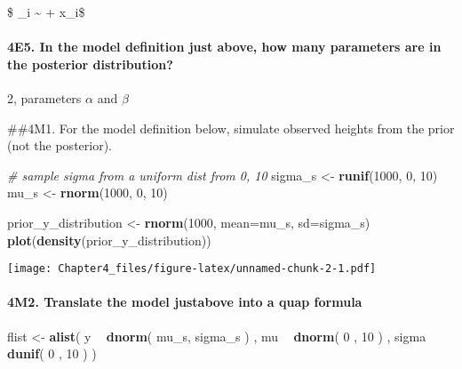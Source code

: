 \documentclass[]{article}
\newenvironment{Shaded}{\begin{snugshade}}{\end{snugshade}}
\newcommand{\CommentTok}[1]{\textcolor[rgb]{0.56,0.35,0.01}{\textit{#1}}}
\newcommand{\DataTypeTok}[1]{\textcolor[rgb]{0.13,0.29,0.53}{#1}}
\newcommand{\DecValTok}[1]{\textcolor[rgb]{0.00,0.00,0.81}{#1}}
\newcommand{\KeywordTok}[1]{\textcolor[rgb]{0.13,0.29,0.53}{\textbf{#1}}}
\newcommand{\NormalTok}[1]{#1}
\newcommand{\OperatorTok}[1]{\textcolor[rgb]{0.81,0.36,0.00}{\textbf{#1}}}
\newcommand{\StringTok}[1]{\textcolor[rgb]{0.31,0.60,0.02}{#1}}
\let\oldparagraph\paragraph
\renewcommand{\paragraph}[1]{\oldparagraph{#1}\mbox{}}
\begin{document}
\$ \mu \_i \textasciitilde{} \alpha + \beta x\_i\$

\hypertarget{e5.-in-the-model-definition-just-above-how-many-parameters-are-in-the-posterior-distribution}{%
\paragraph{4E5. In the model definition just above, how many parameters
are in the posterior
distribution?}\label{e5.-in-the-model-definition-just-above-how-many-parameters-are-in-the-posterior-distribution}}

2, parameters \(\alpha\) and \(\beta\)

\#\#4M1. For the model definition below, simulate observed heights from
the prior (not the posterior).

\begin{Shaded}
\begin{Highlighting}[]
\CommentTok{# sample sigma from a uniform dist from 0, 10}
\NormalTok{sigma_s <-}\StringTok{ }\KeywordTok{runif}\NormalTok{(}\DecValTok{1000}\NormalTok{, }\DecValTok{0}\NormalTok{, }\DecValTok{10}\NormalTok{)}
\NormalTok{mu_s <-}\StringTok{ }\KeywordTok{rnorm}\NormalTok{(}\DecValTok{1000}\NormalTok{, }\DecValTok{0}\NormalTok{, }\DecValTok{10}\NormalTok{)}

\NormalTok{prior_y_distribution <-}\StringTok{ }\KeywordTok{rnorm}\NormalTok{(}\DecValTok{1000}\NormalTok{, }\DataTypeTok{mean=}\NormalTok{mu_s, }\DataTypeTok{sd=}\NormalTok{sigma_s)}
\KeywordTok{plot}\NormalTok{(}\KeywordTok{density}\NormalTok{(prior_y_distribution))}
\end{Highlighting}
\end{Shaded}

\texttt{[image: Chapter4\_files/figure-latex/unnamed-chunk-2-1.pdf]}

\hypertarget{m2.-translate-the-model-justabove-into-a-quap-formula}{%
\paragraph{4M2. Translate the model justabove into a quap
formula}\label{m2.-translate-the-model-justabove-into-a-quap-formula}}

\begin{Shaded}
\begin{Highlighting}[]
\NormalTok{flist <-}\StringTok{ }\KeywordTok{alist}\NormalTok{(}
\NormalTok{    y }\OperatorTok{~}\StringTok{ }\KeywordTok{dnorm}\NormalTok{( mu_s, sigma_s ) ,}
\NormalTok{    mu }\OperatorTok{~}\StringTok{ }\KeywordTok{dnorm}\NormalTok{( }\DecValTok{0}\NormalTok{ , }\DecValTok{10}\NormalTok{ ) ,}
\NormalTok{    sigma }\OperatorTok{~}\StringTok{ }\KeywordTok{dunif}\NormalTok{( }\DecValTok{0}\NormalTok{ , }\DecValTok{10}\NormalTok{ )}
\NormalTok{)}
\end{Highlighting}
\end{Shaded}
\end{document}
